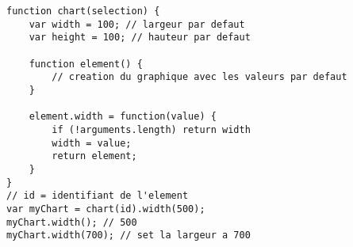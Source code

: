 \newpage
\lstset{language=JavaScript}
\begin{lstlisting}[caption={Exemple de \textit{method chaining} proposé par Mike Bostock}]
function chart(selection) {
	var width = 100; // largeur par defaut
	var height = 100; // hauteur par defaut
	
	function element() {
		// creation du graphique avec les valeurs par defaut
	}
	
	element.width = function(value) {
		if (!arguments.length) return width
		width = value;
		return element;
	}
}
// id = identifiant de l'element
var myChart = chart(id).width(500);
myChart.width(); // 500
myChart.width(700); // set la largeur a 700
\end{lstlisting}
